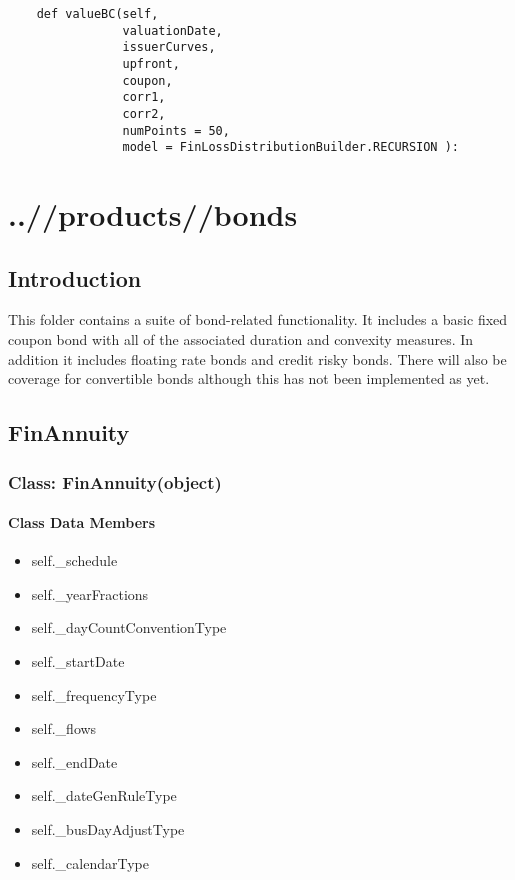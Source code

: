 \documentclass[twoside,11pt]{book}
\begin{document}
\begin{lstlisting}
    def valueBC(self, 
                valuationDate,
                issuerCurves,
                upfront,
                coupon,
                corr1,
                corr2,
                numPoints = 50,
                model = FinLossDistributionBuilder.RECURSION ):
\end{lstlisting}


\chapter{..//products//bonds}
\section{Introduction}
This folder contains a suite of bond-related functionality. It includes a basic fixed coupon bond with all of the associated duration and convexity measures. In addition it includes floating rate bonds and credit risky bonds. There will also be coverage for convertible bonds although this has not been implemented as yet.

\newpage
\section{FinAnnuity}

\subsection{Class: FinAnnuity(object)}


\subsubsection{Class Data Members}
\begin{itemize}
\item{self.\_schedule}
\item{self.\_yearFractions}
\item{self.\_dayCountConventionType}
\item{self.\_startDate}
\item{self.\_frequencyType}
\item{self.\_flows}
\item{self.\_endDate}
\item{self.\_dateGenRuleType}
\item{self.\_busDayAdjustType}
\item{self.\_calendarType}
\end{itemize}
\end{document}
